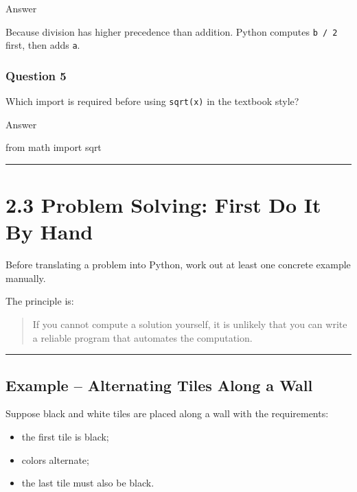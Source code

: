 \documentclass[
]{article}
\newenvironment{Shaded}{\begin{snugshade}}{\end{snugshade}}
\newcommand{\ImportTok}[1]{#1}
\newcommand{\NormalTok}[1]{#1}
\providecommand{\tightlist}{%
  \setlength{\itemsep}{0pt}\setlength{\parskip}{0pt}}
\begin{document}
Answer

Because division has higher precedence than addition. Python computes
\texttt{b\ /\ 2} first, then adds \texttt{a}.

\subsubsection{Question 5}\label{question-5-1}

Which import is required before using \texttt{sqrt(x)} in the textbook
style?

Answer

\begin{Shaded}
\begin{Highlighting}[]
\ImportTok{from}\NormalTok{ math }\ImportTok{import}\NormalTok{ sqrt}
\end{Highlighting}
\end{Shaded}

\begin{center}\rule{0.5\linewidth}{0.5pt}\end{center}

\section{2.3 Problem Solving: First Do It By
Hand}\label{problem-solving-first-do-it-by-hand}

Before translating a problem into Python, work out at least one concrete
example manually.

The principle is:

\begin{quote}
If you cannot compute a solution yourself, it is unlikely that you can
write a reliable program that automates the computation.
\end{quote}

\begin{center}\rule{0.5\linewidth}{0.5pt}\end{center}

\subsection{Example -- Alternating Tiles Along a
Wall}\label{example-alternating-tiles-along-a-wall}

Suppose black and white tiles are placed along a wall with the
requirements:

\begin{itemize}
\tightlist
\item
  the first tile is black;
\item
  colors alternate;
\item
  the last tile must also be black.
\end{itemize}
\end{document}
